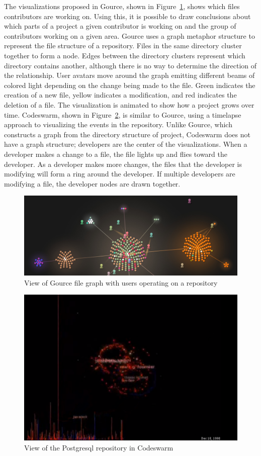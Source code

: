 The visualizations proposed in Gource\cite{Caudwell2010}, shown in
Figure~\ref{fig:gource_view}, shows which files contributors are working
on.
Using this, it is possible to draw conclusions about which parts of a
project a given contributor is working on and the group of contributors
working on a given area. Gource uses a graph metaphor structure to
represent the file structure of a repository. Files in the same
directory cluster together to form a node. Edges between the directory
clusters represent which directory contains another, although there is
no way to determine the direction of the relationship.
User avatars move around the graph emitting different beams of colored
light depending on the change being made to the file.
Green indicates the creation of a new
file, yellow indicates a modification, and red indicates the deletion of
a file. The visualization is animated to show how a project grows over
time. Codeswarm\cite{ogawa09}, shown in Figure~\ref{fig:codeswarm}, is
similar to Gource, using a timelapse approach to visualizing the events
in the repository.
Unlike Gource, which constructs a graph from the directory structure
of project, Codeswarm does not have a graph structure;
developers are the center of the visualizations.
When a developer makes a change to a file, the file lights up and
flies toward the developer.
As a developer makes more changes, the files that the developer is
modifying will form a ring around the developer.
If multiple developers are modifying a file, the developer nodes
are drawn together.

\begin{figure}[htpb]
  \centering
  \includegraphics[width=0.8\linewidth]{./Figures/introduction/gource-linux.jpg}
  \caption{View of Gource file graph with users operating on a
    repository}
  \label{fig:gource_view}
\end{figure}

\begin{figure}[htpb]
  \centering
  \includegraphics[width=0.8\linewidth]{Figures/introduction/codeswarm.png}
  \caption{View of the Postgresql repository in Codeswarm}
  \label{fig:codeswarm}
\end{figure}

